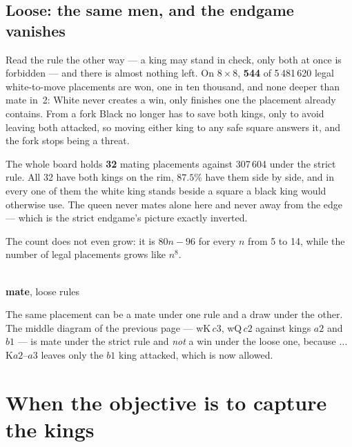 \documentclass[11pt]{article}
\begin{document}
\subsection{Loose: the same men, and the endgame vanishes}\label{sub:kqkk-loose}

\begin{center}
\begin{minipage}{0.62\textwidth}
Read the rule the other way --- a king may stand in check, only both at once is
forbidden --- and there is almost nothing left. On $8\times8$, \textbf{544} of
5\,481\,620 legal white-to-move placements are won, one in ten thousand, and
none deeper than mate in~2: White never creates a win, only finishes one the
placement already contains. From a fork Black no longer has to save both kings,
only to avoid leaving both attacked, so moving either king to any safe square
answers it, and the fork stops being a threat.

\smallskip
The whole board holds \textbf{32} mating placements against 307\,604 under the
strict rule. All 32 have both kings on the rim, $87.5\%$ have them side by
side, and in every one of them the white king stands beside a square a black
king would otherwise use. The queen never mates alone here and never away from
the edge --- which is the strict endgame's picture exactly inverted.

\smallskip
The count does not even grow: it is $80n-96$ for every $n$ from 5 to 14, while
the number of legal placements grows like $n^8$.
\end{minipage}\hfill
\begin{minipage}{0.33\textwidth}\centering
  \\[1.5mm]
  {\small\color{kqkk}\textbf{mate}, loose rules}
\end{minipage}
\end{center}

\noindent
The same placement can be a mate under one rule and a draw under the other. The
middle diagram of the previous page --- wK\,$c3$, wQ\,$c2$ against kings $a2$
and $b1$ --- is mate under the strict rule and \emph{not} a win under the
loose one, because $\ldots$K$a2$--$a3$ leaves only the $b1$ king attacked,
which is now allowed.

\section{When the objective is to capture the kings}\label{sec:capture}
\end{document}
